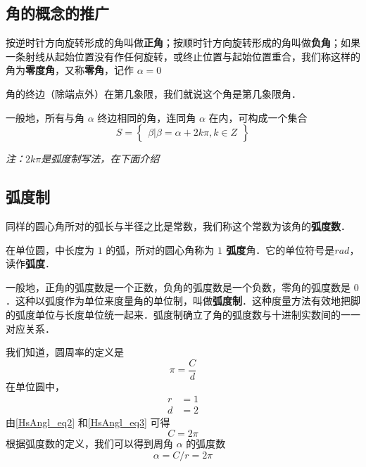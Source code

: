 
\begin{issues}
\issueDraft
\end{issues}

\subsection{角的概念的推广}
按逆时针方向旋转形成的角叫做\textbf{正角}；按顺时针方向旋转形成的角叫做\textbf{负角}；如果一条射线从起始位置没有作任何旋转，或终止位置与起始位置重合，我们称这样的角为\textbf{零度角}，又称\textbf{零角}，记作 $\alpha = 0$

角的终边（除端点外）在第几象限，我们就说这个角是第几象限角．

一般地，所有与角 $\alpha$ 终边相同的角，连同角 $\alpha$ 在内，可构成一个集合
\begin{equation}
S = \begin{Bmatrix} \beta|\beta=\alpha+2k\pi,k \in Z \end{Bmatrix}
\end{equation}

\textsl{注：$2k\pi$是弧度制写法，在下面介绍}

\subsection{弧度制}
同样的圆心角所对的弧长与半径之比是常数，我们称这个常数为该角的\textbf{弧度数}．

在单位圆，中长度为 $1$ 的弧，所对的圆心角称为 \textbf{$1$ 弧度}角．它的单位符号是$rad$，读作\textbf{弧度}．

一般地，正角的弧度数是一个正数，负角的弧度数是一个负数，零角的弧度数是 $0$．这种以弧度作为单位来度量角的单位制，叫做\textbf{弧度制}．这种度量方法有效地把脚的弧度单位与长度单位统一起来．弧度制确立了角的弧度数与十进制实数间的一一对应关系．

我们知道，圆周率的定义是
\begin{equation}\label{HsAngl_eq2}
\pi = \frac{C}{d}
\end{equation}
在单位圆中，
\begin{equation}\label{HsAngl_eq3}
\begin{aligned}
r &= 1\\
d &= 2
\end{aligned}
\end{equation}
由\autoref{HsAngl_eq2} 和\autoref{HsAngl_eq3} 可得
\begin{equation}
C = 2\pi
\end{equation}
根据弧度数的定义，我们可以得到周角 $\alpha$ 的弧度数
\begin{equation}
\alpha = C / r = 2\pi
\end{equation}